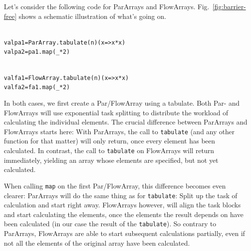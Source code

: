 \documentclass[runningheads,a4paper,fleqn]{llncs}
\begin{document}
Let's consider the following code for ParArrays and
FlowArrays. Fig.~\ref{fig:barrier-free} shows a schematic
illustration of what's going on.

\noindent
\begin{minipage}[t]{.5\textwidth}
\begin{alltt}
{\scriptsize
val pa1 = ParArray.tabulate(n)(x => x*x)
val pa2 = pa1.map(_ * 2)
}
\end{alltt}
\end{minipage}
\begin{minipage}[t]{.5\textwidth}
\begin{alltt}
{\scriptsize
val fa1 = FlowArray.tabulate(n)(x => x*x)
val fa2 = fa1.map(_ * 2)
}
\end{alltt}
\end{minipage}

In both cases, we first create a Par/FlowArray using a tabulate. Both
Par- and FlowArrays will use exponential task splitting
\cite{collect11,cong08} to distribute the workload of calculating the
individual elements. The crucial difference between ParArrays and
FlowArrays starts here: With ParArrays, the call to \texttt{tabulate}
(and any other function for that matter) will only return, once every
element has been calculated. In contrast, the call to
\texttt{tabulate} on FlowArrays will return immediately, yielding an
array whose elements are specified, but not yet calculated.

When calling \texttt{map} on the first Par/FlowArray, this difference
becomes even clearer: ParArrays will do the same thing as for
\texttt{tabulate}: Split up the task of calculation and start right
away. FlowArrays however, will align the task blocks and start
calculating the elements, once the elements the result depends on have
been calculated (in our case the result of the \texttt{tabulate}). So
contrary to ParArrays, FlowArrays are able to start subsequent
calculations partially, even if not all the elements of the original
array have been calculated.
\end{document}
